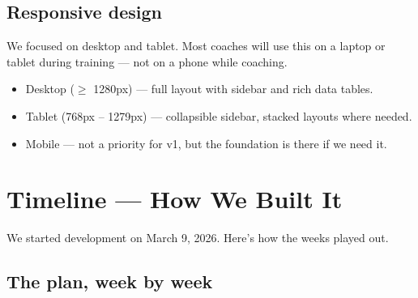\documentclass[11pt,a4paper]{article}
\begin{document}
\subsection{Responsive design}

We focused on desktop and tablet. Most coaches will use this on a laptop or tablet during training — not on a phone while coaching.

\begin{itemize}
  \item Desktop ($\geq$ 1280px) — full layout with sidebar and rich data tables.
  \item Tablet (768px – 1279px) — collapsible sidebar, stacked layouts where needed.
  \item Mobile — not a priority for v1, but the foundation is there if we need it.
\end{itemize}

\newpage

\section{Timeline — How We Built It}

We started development on March 9, 2026. Here's how the weeks played out.

\subsection{The plan, week by week}
\end{document}
